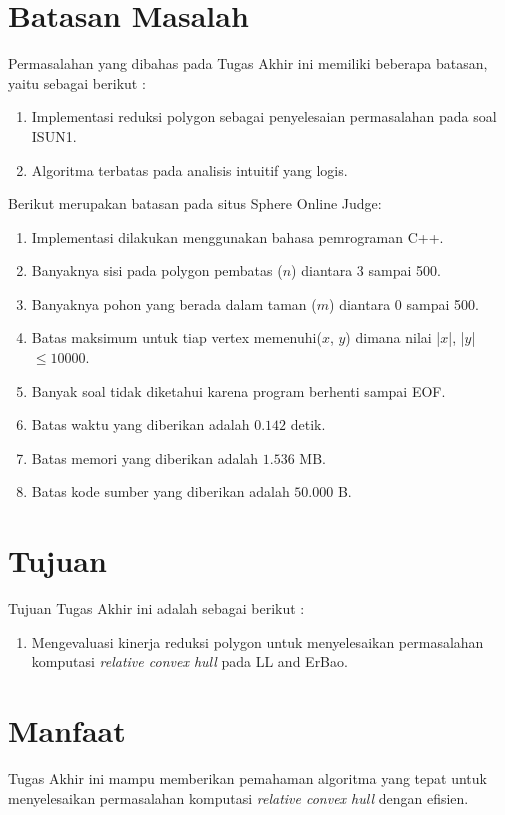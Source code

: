 \section {Batasan Masalah}
\label{sec:batasan_masalah}
Permasalahan yang dibahas pada Tugas Akhir ini memiliki beberapa batasan, yaitu sebagai berikut :
\begin{enumerate}
    \item Implementasi reduksi polygon sebagai penyelesaian permasalahan \RCH pada soal ISUN1.
    \item Algoritma \RCH terbatas pada analisis intuitif yang logis.
\end{enumerate}
Berikut merupakan batasan pada situs Sphere Online Judge: 
\begin {enumerate}
    \item Implementasi dilakukan menggunakan bahasa pemrograman C++.
    \item Banyaknya sisi pada polygon pembatas ($n$) diantara 3 sampai 500.
    \item Banyaknya pohon yang berada dalam taman ($m$) diantara 0 sampai 500.
    \item Batas maksimum untuk tiap vertex memenuhi($ x $, $ y $) dimana nilai |$x$|, |$y$| $\leq 10000$. 
    \item Banyak soal tidak diketahui karena program berhenti sampai EOF.
    \item Batas waktu yang diberikan adalah $ 0.142 $ detik.
    \item Batas memori yang diberikan adalah $ 1.536 $ MB.
    \item Batas kode sumber yang diberikan adalah $ 50.000 $ B. 
\end {enumerate}

\section {Tujuan}
Tujuan Tugas Akhir ini adalah sebagai berikut :
\begin{enumerate}
    \item Mengevaluasi kinerja reduksi polygon untuk menyelesaikan permasalahan komputasi \textit{relative convex hull} pada LL and ErBao.
\end{enumerate}

\section {Manfaat}
Tugas Akhir ini mampu memberikan pemahaman algoritma yang tepat untuk menyelesaikan permasalahan komputasi \textit{relative convex hull} dengan efisien.

